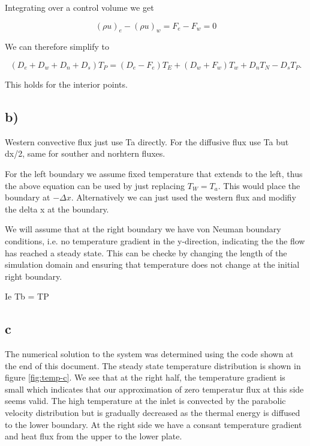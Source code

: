 \documentclass{article}
\begin{document}
Integrating over a control volume we get

\begin{equation}
(\rho u)_e - (\rho u)_w  = F_e - F_w = 0
\end{equation}

We can therefore simplify to

\begin{equation}
(D_e + D_w + D_n + D_s) T_P = (D_e - F_e) T_E + (D_w+F_w) T_w + D_n T_N - D_s T_P.
\end{equation}

This holds for the interior points.

\subsection{b)}

Western convective flux just use Ta directly. 
For the diffusive flux use Ta but dx/2, same for souther and norhtern fluxes.

For the left boundary we assume fixed temperature that extends to the left, thus the above equation can be used by just replacing $T_W = T_a$. This would place the boundary at $-\Delta x$. Alternatively we can just used the western flux and modifiy the delta x at the boundary.

We will assume that at the right boundary we have von Neuman boundary conditions, i.e. no temperature gradient in the y-direction, indicating the the flow has reached a steady state. This can be checke by changing the length of the simulation domain and ensuring that temperature does not change at the initial right boundary.

Ie Tb = TP

\subsection{c}

The numerical solution to the system was determined using the code shown at the end of this document. The steady state temperature distribution is shown in figure \ref{fig:temp-c}. We see that at the right half, the temperature gradient is small which indicates that our approximation of zero temperatur flux at this side seems valid. The high temperature at the inlet is convected by the parabolic velocity distribution but is gradually decreased as the thermal energy is diffused to the lower boundary. At the right side we have a consant temperature gradient  and heat flux from the upper to the lower plate.
\end{document}
